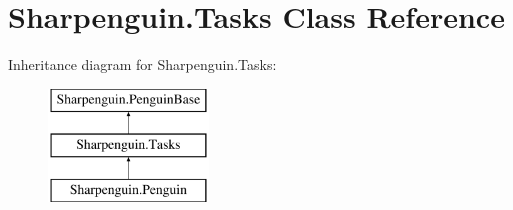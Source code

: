 \hypertarget{classSharpenguin_1_1Tasks}{\section{Sharpenguin.\-Tasks Class Reference}
\label{classSharpenguin_1_1Tasks}
}
Inheritance diagram for Sharpenguin.\-Tasks\-:\begin{figure}[H]
\begin{center}
\leavevmode
\includegraphics[height=3.000000cm]{classSharpenguin_1_1Tasks}
\end{center}
\end{figure}
